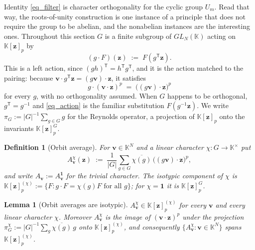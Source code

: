 \documentclass[final]{siamltex}
\newtheorem{lemma}[lemma]{Lemma}
\newtheorem{definition}[definition]{Definition}
\newcommand{\K}{\mathbb{K}}
\newcommand{\bz}{\bm{z}}
\newcommand{\bv}{\bm{v}}
\newcommand{\abs}[1]{\left|#1\right|}
\begin{document}
Identity \eqref{eq_filter} is character orthogonality for the cyclic group
$U_{m}$.  Read that way, the roots-of-unity construction is one instance of a
principle that does not require the group to be abelian, and the nonabelian
instances are the interesting ones.  Throughout this section $G$ is a finite
subgroup of $GL_{N}(\K)$ acting on $\K[\bz]_{p}$ by
\begin{equation}\label{eq_action}
  (g \cdot F)(\bz) \;:=\; F(g^{\mathsf{T}}\bz).
\end{equation}
This is a left action, since $(gh)^{\mathsf{T}} = h^{\mathsf{T}}g^{\mathsf{T}}$,
and it is the action matched to the pairing: because
$\bv \cdot g^{\mathsf{T}}\bz = (g\bv)\cdot\bz$, it satisfies
\begin{equation}\label{eq_compat}
  g \cdot (\bv\cdot\bz)^{p} \;=\; \bigl((g\bv)\cdot\bz\bigr)^{p}
\end{equation}
for every $g$, with no orthogonality assumed.  When $G$ happens to be
orthogonal, $g^{\mathsf{T}} = g^{-1}$ and \eqref{eq_action} is the familiar
substitution $F(g^{-1}\bz)$.  We write
$\pi_{G} := \abs{G}^{-1}\sum_{g\in G} g$ for the Reynolds operator, a projection
of $\K[\bz]_{p}$ onto the invariants $\K[\bz]_{p}^{G}$.

\begin{definition}[Orbit average]\label{def_orbit_avg}
  For $\bv \in \K^{N}$ and a linear character $\chi \colon G \to \K^{\times}$ put
  \begin{equation}\label{eq_orbit_avg}
    A^{\chi}_{\bv}(\bz) \;:=\; \frac{1}{\abs{G}}\sum_{g \in G}
    \overline{\chi(g)}\,\bigl((g\bv)\cdot\bz\bigr)^{p},
  \end{equation}
  and write $A_{\bv} := A^{\mathbf{1}}_{\bv}$ for the trivial character.  The
  \emph{isotypic component} of $\chi$ is
  $\K[\bz]_{p}^{(\chi)} := \{F : g\cdot F = \chi(g)F \text{ for all } g\}$; for
  $\chi = \mathbf{1}$ it is $\K[\bz]_{p}^{G}$.
\end{definition}

\begin{lemma}[Orbit averages are isotypic]\label{lem_isotypic}
  $A^{\chi}_{\bv} \in \K[\bz]_{p}^{(\chi)}$ for every $\bv$ and every linear
  character $\chi$.  Moreover $A^{\chi}_{\bv}$ is the image of
  $(\bv\cdot\bz)^{p}$ under the projection
  $\pi^{\chi}_{G} := \abs{G}^{-1}\sum_{g}\overline{\chi(g)}\,g$ onto
  $\K[\bz]_{p}^{(\chi)}$, and consequently
  $\{A^{\chi}_{\bv} : \bv \in \K^{N}\}$ spans $\K[\bz]_{p}^{(\chi)}$.
\end{lemma}
\end{document}
